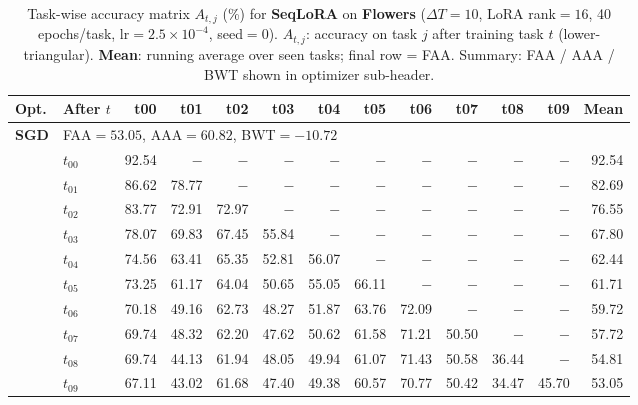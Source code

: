 
\begin{table}[ht]
\centering
\caption{%
  Task-wise accuracy matrix $A_{t,j}$ (\%) for \textbf{SeqLoRA} on \textbf{Flowers}
  ($\Delta T=10$, LoRA rank$=16$, 40 epochs/task, lr$=2.5\times10^{-4}$, seed$=0$).
  $A_{t,j}$: accuracy on task $j$ after training task $t$ (lower-triangular).
  \textbf{Mean}: running average over seen tasks; final row = FAA.
  Summary: FAA / AAA / BWT shown in optimizer sub-header.
}
\label{tab:raw_seqlora_flowers}
\setlength{\tabcolsep}{2.8pt}
\renewcommand{\arraystretch}{0.88}
\scriptsize
\begin{tabular}{@{}l l r r r r r r r r r r r@{}}
\toprule
\textbf{Opt.} & \textbf{After $t$} & \textbf{t00} & \textbf{t01} & \textbf{t02} & \textbf{t03} & \textbf{t04} & \textbf{t05} & \textbf{t06} & \textbf{t07} & \textbf{t08} & \textbf{t09} & \textbf{Mean} \\
\midrule
\multirow{11}{*}{\textbf{SGD}} & \multicolumn{12}{l}{\quad\small FAA$=53.05$,\; AAA$=60.82$,\; BWT$=-10.72$} \\
 & $t_{00}$ & 92.54 & $-$ & $-$ & $-$ & $-$ & $-$ & $-$ & $-$ & $-$ & $-$ & 92.54 \\
 & $t_{01}$ & 86.62 & 78.77 & $-$ & $-$ & $-$ & $-$ & $-$ & $-$ & $-$ & $-$ & 82.69 \\
 & $t_{02}$ & 83.77 & 72.91 & 72.97 & $-$ & $-$ & $-$ & $-$ & $-$ & $-$ & $-$ & 76.55 \\
 & $t_{03}$ & 78.07 & 69.83 & 67.45 & 55.84 & $-$ & $-$ & $-$ & $-$ & $-$ & $-$ & 67.80 \\
 & $t_{04}$ & 74.56 & 63.41 & 65.35 & 52.81 & 56.07 & $-$ & $-$ & $-$ & $-$ & $-$ & 62.44 \\
 & $t_{05}$ & 73.25 & 61.17 & 64.04 & 50.65 & 55.05 & 66.11 & $-$ & $-$ & $-$ & $-$ & 61.71 \\
 & $t_{06}$ & 70.18 & 49.16 & 62.73 & 48.27 & 51.87 & 63.76 & 72.09 & $-$ & $-$ & $-$ & 59.72 \\
 & $t_{07}$ & 69.74 & 48.32 & 62.20 & 47.62 & 50.62 & 61.58 & 71.21 & 50.50 & $-$ & $-$ & 57.72 \\
 & $t_{08}$ & 69.74 & 44.13 & 61.94 & 48.05 & 49.94 & 61.07 & 71.43 & 50.58 & 36.44 & $-$ & 54.81 \\
 & $t_{09}$ & 67.11 & 43.02 & 61.68 & 47.40 & 49.38 & 60.57 & 70.77 & 50.42 & 34.47 & 45.70 & 53.05 \\
\midrule

\end{tabular}
\end{table}
